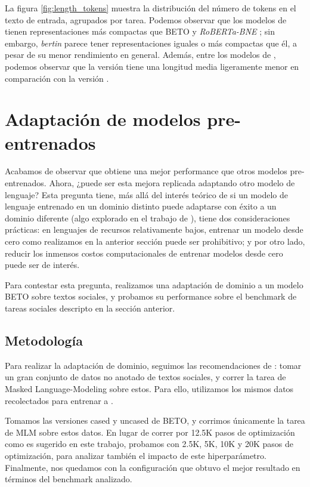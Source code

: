 La figura \ref{fig:length_tokens} muestra la distribución del número de tokens en el texto de entrada, agrupados por tarea. Podemos observar que los modelos de \robertuito{} tienen representaciones más compactas que BETO  y \emph {RoBERTa-BNE} ; sin embargo, \emph{bertin} parece tener representaciones iguales o más compactas que él, a pesar de su menor rendimiento en general. Además, entre los modelos de \robertuito{}, podemos observar que la versión \deacc{} tiene una longitud media ligeramente menor en comparación con la versión \uncased{}.


\section{Adaptación de modelos pre-entrenados}

Acabamos de observar que \robertuito{} obtiene una mejor performance que otros modelos pre-entrenados. Ahora, ¿puede ser esta mejora replicada adaptando otro modelo de lenguaje? Esta pregunta tiene, más allá del interés teórico de si un modelo de lenguaje entrenado en un dominio distinto puede adaptarse con éxito a un dominio diferente (algo explorado en el trabajo de \citet{gururangan-etal-2020-dont}), tiene dos consideraciones prácticas: en lenguajes de recursos relativamente bajos, entrenar un modelo desde cero como realizamos en la anterior sección puede ser prohibitivo; y por otro lado, reducir los inmensos costos computacionales de entrenar modelos desde cero puede ser de interés.

Para contestar esta pregunta, realizamos una adaptación de dominio a un modelo BETO sobre textos sociales, y probamos su performance sobre el benchmark de tareas sociales descripto en la sección anterior.


\subsection{Metodología}

Para realizar la adaptación de dominio, seguimos las recomendaciones de \citet{gururangan-etal-2020-dont}: tomar un gran conjunto de datos no anotado de textos sociales, y correr la tarea de Masked Language-Modeling sobre estos. Para ello, utilizamos los mismos datos recolectados para entrenar a \robertuito{}.

Tomamos las versiones cased y uncased de BETO, y corrimos únicamente la tarea de MLM sobre estos datos. En lugar de correr por 12.5K pasos de optimización como es sugerido en este trabajo, probamos con 2.5K, 5K, 10K y 20K pasos de optimización, para analizar también el impacto de este hiperparámetro. Finalmente, nos quedamos con la configuración que obtuvo el mejor resultado en términos del benchmark analizado.

